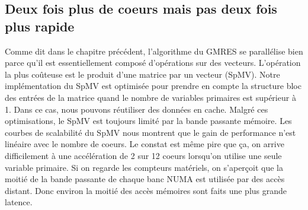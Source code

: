 \subsection{Deux fois plus de coeurs mais pas deux fois plus rapide}
Comme dit dans le chapitre précédent, l'algorithme du GMRES se parallélise bien parce qu'il est essentiellement composé d'opérations sur des vecteurs.
%
L'opération la plus coûteuse est le produit d'une matrice par un vecteur (SpMV).
%
Notre implémentation du SpMV est optimisée pour prendre en compte la structure bloc des entrées de la matrice quand le nombre de variables primaires est supérieur à 1.
%
Dans ce cas, nous pouvons réutiliser des données en cache.
%
Malgré ces optimisations, le SpMV est toujours limité par la bande passante mémoire.
%
Les courbes de scalabilité du SpMV nous montrent que le gain de performance n'est linéaire avec le nombre de coeurs.
%
Le constat est même pire que ça, on arrive difficilement à une accélération de 2 sur 12 coeurs lorsqu'on utilise une seule variable primaire.
%
Si on regarde les compteurs matériels, on s'aperçoit que la moitié de la bande passante de chaque banc NUMA est utilisée par des accès distant.
%
Donc environ la moitié des accès mémoires sont faits une plus grande latence.
